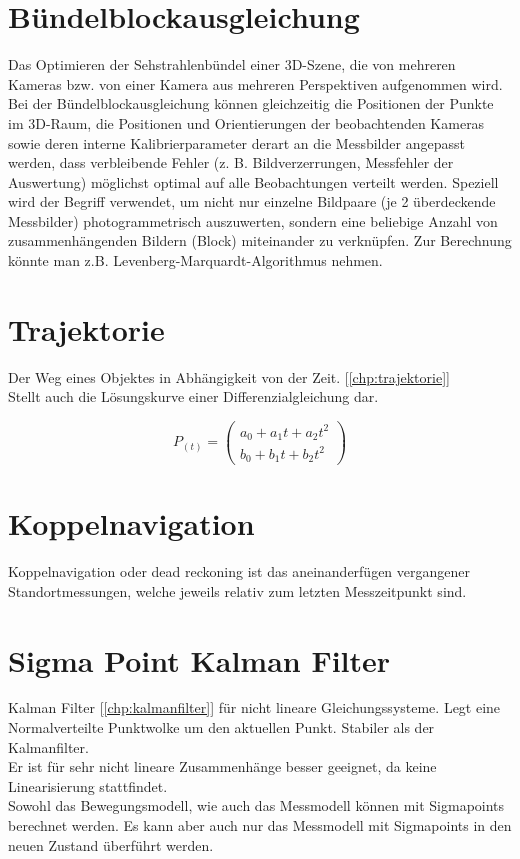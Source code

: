 \section{Bündelblockausgleichung}
\label{chp:stoffübersicht:sec:Bündelblockausgleichung}
Das Optimieren der \glqq{}Sehstrahlenbündel\grqq{} einer 3D-Szene, die von mehreren Kameras bzw. von einer Kamera aus mehreren Perspektiven
aufgenommen wird. Bei der Bündelblockausgleichung können gleichzeitig die Positionen der Punkte im 3D-Raum, die Positionen und
Orientierungen der beobachtenden Kameras sowie deren interne Kalibrierparameter derart an die Messbilder angepasst werden, dass
verbleibende Fehler (z. B. Bildverzerrungen, Messfehler der Auswertung) möglichst optimal auf alle Beobachtungen verteilt werden.
Speziell wird der Begriff verwendet, um nicht nur einzelne Bildpaare (je 2 überdeckende Messbilder) photogrammetrisch auszuwerten,
sondern eine beliebige Anzahl von zusammenhängenden Bildern (Block) miteinander zu verknüpfen. Zur Berechnung könnte man z.B.
Levenberg-Marquardt-Algorithmus nehmen. 

\section{Trajektorie}
\label{chp:stoffübersicht:sec:Trajektorie}
Der Weg eines Objektes in Abhängigkeit von der Zeit. [\ref{chp:trajektorie}]\\
Stellt auch die Lösungskurve einer Differenzialgleichung dar.

\begin{equation}
P_{(t)} = 
\left(
	\begin{array}{c}
	a_0 + a_1t + a_2t^2 \\
	b_0 + b_1t + b_2t^2
	\end{array} 
\right)
\end{equation} 

\section{Koppelnavigation}
\label{chp:stoffübersicht:sec:Koppelnavigation}
Koppelnavigation oder dead reckoning ist das aneinanderfügen vergangener Standortmessungen, welche jeweils relativ zum letzten Messzeitpunkt sind.

\section{Sigma Point Kalman Filter}
\label{chp:stoffübersicht:sec:SigmaPointKalmanFilter}
Kalman Filter [\ref{chp:kalmanfilter}] für nicht lineare Gleichungssysteme. Legt eine Normalverteilte Punktwolke um den aktuellen Punkt. Stabiler als der Kalmanfilter.\\
Er ist für sehr nicht lineare Zusammenhänge besser geeignet, da keine Linearisierung stattfindet.\\
Sowohl das Bewegungsmodell, wie auch das Messmodell können mit Sigmapoints berechnet werden. Es kann aber auch nur das Messmodell mit Sigmapoints in den neuen Zustand überführt werden.

